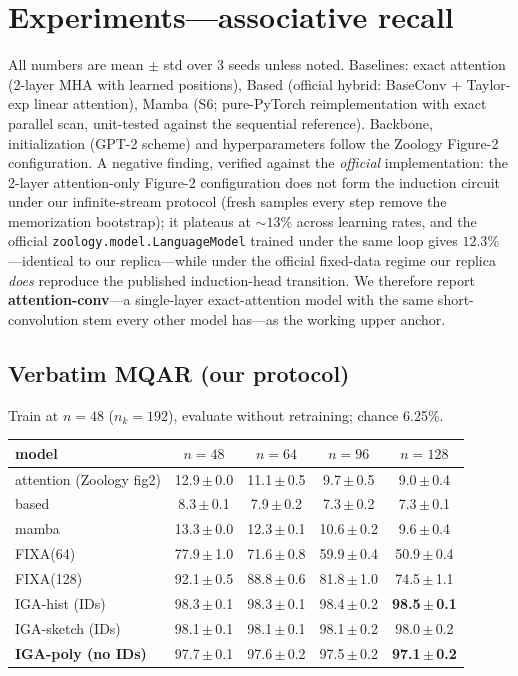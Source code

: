 \documentclass[11pt]{article}
\begin{document}
\section{Experiments---associative recall}

All numbers are mean $\pm$ std over 3 seeds unless noted. Baselines: exact
attention (2-layer MHA with learned positions), Based (official hybrid: BaseConv +
Taylor-exp linear attention), Mamba (S6; pure-PyTorch reimplementation with exact
parallel scan, unit-tested against the sequential reference). Backbone,
initialization (GPT-2 scheme) and hyperparameters follow the Zoology Figure-2
configuration. A negative finding, verified against the \emph{official}
implementation: the 2-layer attention-only Figure-2 configuration does not form the
induction circuit under our infinite-stream protocol (fresh samples every step
remove the memorization bootstrap); it plateaus at $\sim$$13\%$ across learning
rates, and the official \texttt{zoology.model.LanguageModel} trained under the same
loop gives $12.3\%$---identical to our replica---while under the official
fixed-data regime our replica \emph{does} reproduce the published induction-head
transition. We therefore report \textbf{attention-conv}---a single-layer
exact-attention model with the same short-convolution stem every other model
has---as the working upper anchor.

\subsection{Verbatim MQAR (our protocol)}

Train at $n=48$ ($n_k=192$), evaluate without retraining; chance 6.25\%.

\begin{table}[h]\centering
\begin{tabular}{lcccc}
\toprule
model & $n{=}48$ & $n{=}64$ & $n{=}96$ & $n{=}128$ \\
\midrule
attention (Zoology fig2) & 12.9\,$\pm$\,0.0 & 11.1\,$\pm$\,0.5 & 9.7\,$\pm$\,0.5 & 9.0\,$\pm$\,0.4 \\
based                   & 8.3\,$\pm$\,0.1  & 7.9\,$\pm$\,0.2  & 7.3\,$\pm$\,0.2 & 7.3\,$\pm$\,0.1 \\
mamba                   & 13.3\,$\pm$\,0.0 & 12.3\,$\pm$\,0.1 & 10.6\,$\pm$\,0.2 & 9.6\,$\pm$\,0.4 \\
FIXA(64)                & 77.9\,$\pm$\,1.0 & 71.6\,$\pm$\,0.8 & 59.9\,$\pm$\,0.4 & 50.9\,$\pm$\,0.4 \\
FIXA(128)               & 92.1\,$\pm$\,0.5 & 88.8\,$\pm$\,0.6 & 81.8\,$\pm$\,1.0 & 74.5\,$\pm$\,1.1 \\
IGA-hist (IDs)          & 98.3\,$\pm$\,0.1 & 98.3\,$\pm$\,0.1 & 98.4\,$\pm$\,0.2 & \textbf{98.5\,$\pm$\,0.1} \\
IGA-sketch (IDs)        & 98.1\,$\pm$\,0.1 & 98.1\,$\pm$\,0.1 & 98.1\,$\pm$\,0.2 & 98.0\,$\pm$\,0.2 \\
\textbf{IGA-poly (no IDs)} & 97.7\,$\pm$\,0.1 & 97.6\,$\pm$\,0.2 & 97.5\,$\pm$\,0.2 & \textbf{97.1\,$\pm$\,0.2} \\
\bottomrule
\end{tabular}
\end{table}
\end{document}
